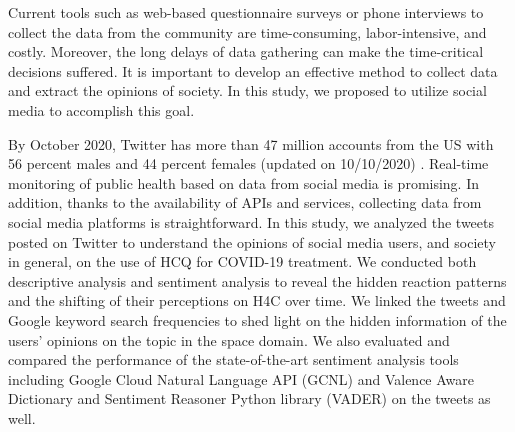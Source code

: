 \documentclass[conference]{IEEEtran}
\begin{document}
	\par
	Current tools such as web-based questionnaire surveys or phone interviews to collect the data from the community are time-consuming, labor-intensive, and costly. Moreover, the long delays of data gathering can make the time-critical decisions suffered. 
	It is important to develop an effective method to collect data and extract the opinions of society. In this study, we proposed to utilize social media to accomplish this goal.
	\par
	By October 2020, Twitter has more than 47 million accounts from the US with 56 percent males and 44 percent females (updated on 10/10/2020) \cite{b15}. Real-time monitoring of public health based on data from social media is promising. In addition, thanks to the availability of APIs and services, collecting data from social media platforms is straightforward. In this study, we analyzed the tweets posted on Twitter to understand the opinions of social media users, and society in general, on the use of HCQ for COVID-19 treatment. We conducted both descriptive analysis and sentiment analysis to reveal the hidden reaction patterns and the shifting of their perceptions on H4C over time. We linked the tweets and Google keyword search frequencies to shed light on the hidden information of the users' opinions on the topic in the space domain. We also evaluated and compared the performance of the state-of-the-art sentiment analysis tools including Google Cloud Natural Language API (GCNL) and Valence Aware Dictionary and Sentiment Reasoner Python library (VADER) on the tweets as well.
	
\end{document}
